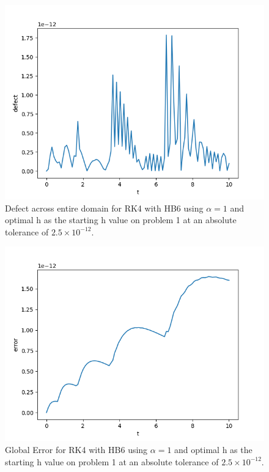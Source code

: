 \begin{figure}[H]
\centering
\includegraphics[width=0.7\linewidth]{./figures/sharp_tolerance_rk4_with_hb6_p1_global_defect}
\caption{Defect across entire domain for RK4 with HB6 using $\alpha = 1$ and optimal h as the starting h value on problem 1 at an absolute tolerance of $2.5 \times 10^{-12}$.}
\label{fig:sharp_tolerance_rk4_with_hb6_p1_global_defect}
\end{figure}

\begin{figure}[H]
\centering
\includegraphics[width=0.7\linewidth]{./figures/sharp_tolerance_rk4_with_hb6_p1_global_error}
\caption{Global Error for RK4 with HB6 using $\alpha = 1$ and optimal h as the starting h value on problem 1 at an absolute tolerance of $2.5 \times 10^{-12}$.}
\label{fig:sharp_tolerance_rk4_with_hb6_p1_global_error}
\end{figure}

